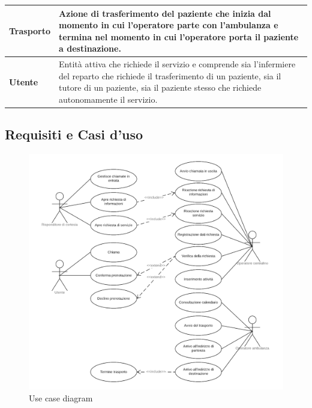 \documentclass[12pt]{article}
\begin{document}
\begin{tabular}{|p{4cm}|p{11cm}|}
\hline
\textbf{Trasporto} & Azione di trasferimento del paziente che inizia dal momento in cui l’operatore parte con l’ambulanza e termina nel momento in cui l’operatore porta il paziente a destinazione.\\

\hline 
\textbf{Utente} & Entità attiva che richiede il servizio e comprende sia l’infermiere del reparto che richiede il trasferimento di un paziente, sia il tutore di un paziente, sia il paziente stesso che richiede autonomamente il servizio.\\

\hline

\end{tabular}

\subsection{Requisiti e Casi d'uso}

 \begin{figure}[!ht]
    \centering
      \includegraphics[width=13cm]{fig/Diagramma dei casi d'uso.png}
      \caption{Use case diagram}
      \label{use_case}
    \end{figure}
    
\end{document}
